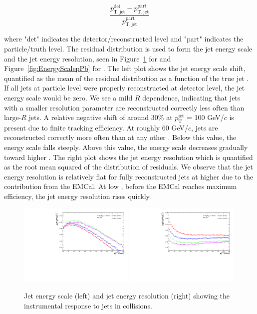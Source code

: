 \begin{equation}
    \frac{p_\mathrm{T,jet}^{\text{det}} - p_\mathrm{T,jet}^{\text{part}}}{p_\mathrm{T,jet}^{\text{part}}}
\end{equation}

\noindent
where "det" indicates the detector/reconstructed level and "part" indicates the particle/truth level. The residual distribution is used to form the jet energy scale and the jet energy resolution, seen in Figure~\ref{fig:EnergyScale} for \pp and Figure~\ref{fig:EnergyScalepPb} for \pPb. The left plot shows the jet energy scale shift, quantified as the mean of the residual distribution as a function of the true jet \pT. If all jets at particle level were properly reconstructed at detector level, the jet energy scale would be zero. We see a mild $R$ dependence, indicating that jets with a smaller resolution parameter are reconstructed correctly less often than large-$R$ jets. A relative negative shift of around 30\% at $p_\mathrm{T}^\mathrm{jet}$ = 100 GeV/$c$ is present due to finite tracking efficiency. At roughly 60 GeV/$c$, jets are reconstructed correctly more often than at any other \pT. Below this value, the energy scale falls steeply. Above this value, the energy scale decreases gradually toward higher \pT. The right plot shows the jet energy resolution which is quantified as the root mean squared of the distribution of residuals. We observe that the jet energy resolution is relatively flat for fully reconstructed jets at higher \pT due to the contribution from the EMCal. At low \pT, before the EMCal reaches maximum efficiency, the jet energy resolution rises quickly.


\begin{figure}[hbt!]
    \centering
    \includegraphics[width=0.49\textwidth]{figures/EnergyScale/EnergyScaleMean.pdf}
    \includegraphics[width=0.49\textwidth]{figures/EnergyScale/EnergyScaleWidth.pdf}
    \caption{Jet energy scale (left) and jet energy resolution (right) showing the instrumental response to jets in \pp collisions.}
    \label{fig:EnergyScale}
\end{figure}

